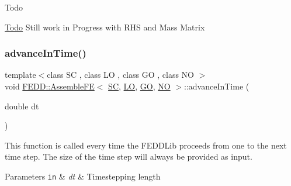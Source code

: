 \begin{DoxyRefDesc}{Todo}
\item[\hyperlink{todo__todo000005}{Todo}]Still work in Progress with R\+HS and Mass Matrix \end{DoxyRefDesc}
\mbox{\label{classFEDD_1_1AssembleFE_aa291b30d2a3f78705b2a7722a1a04d96}} 
\subsubsection{\texorpdfstring{advance\+In\+Time()}{advanceInTime()}}
{\footnotesize\ttfamily template$<$class SC , class LO , class GO , class NO $>$ \\
void \hyperlink{classFEDD_1_1AssembleFE}{F\+E\+D\+D\+::\+Assemble\+FE}$<$ \hyperlink{fe__test__laplace_8cpp_a79c7e86a57edbb2a5a53242bcd04e41e}{SC}, \hyperlink{fe__test__laplace_8cpp_ad6a38c9f07d3fd633eefca5bccad8410}{LO}, \hyperlink{fe__test__laplace_8cpp_afa2946b509009b4f45eb04bd8c5b27d9}{GO}, \hyperlink{fe__test__laplace_8cpp_a5e24f37b28787429872b6ecb1d0417ce}{NO} $>$\+::advance\+In\+Time (\begin{DoxyParamCaption}\item[{double}]{dt }\end{DoxyParamCaption})}



This function is called every time the F\+E\+D\+D\+Lib proceeds from one to the next time step. The size of the time step will always be provided as input. 


\begin{DoxyParams}[1]{Parameters}
\mbox{\tt in}  & {\em dt} & Timestepping length \\
\hline
\end{DoxyParams}
\mbox{\label{classFEDD_1_1AssembleFE_afbb44e574eb47e8e97436e9125f373a0}} 
